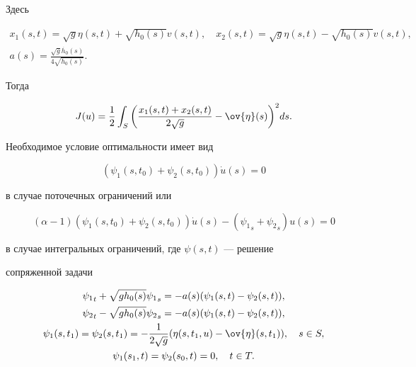 Здесь


\begin{gather*}


x_1(s,t)=\sqrt{g}\eta(s,t)+\sqrt{h_0(s)}v(s,t),\quad


x_2(s,t)=\sqrt{g}\eta(s,t)-\sqrt{h_0(s)}v(s,t),\\


a(s)=\frac{\sqrt{g}\Dot{h_0}(s)}{4\sqrt{h_0(s)}}.


\end{gather*}


Тогда 


\begin{equation}


J(u)=\frac{1}{2}\int_S \bigg(\frac{x_1(s,t)+x_2(s,t)}{2\sqrt{g}}


-\ov{\eta}(s)\bigg)^2 ds.


\label{metf1}


\end{equation}





Необходимое условие оптимальности имеет вид


$$


(\psi_1(s,t_0)+\psi_2(s,t_0))\Dot{u}(s)=0


$$


в случае поточечных ограничений или


$$


(\alpha-1)(\psi_1(s,t_0)+\psi_2(s,t_0))


\Dot{u}(s)-({\psi_1}_s+{\psi_2}_s)u(s)=0


$$


в случае интегральных ограничений, где $\psi(s,t)$ --- решение 


сопряженной задачи


\begin{gather*}


{\psi_1}_t+\sqrt{g h_0(s)}{\psi_1}_s=-a(s)(\psi_1(s,t)-\psi_2(s,t)), \\


{\psi_2}_t-\sqrt{g h_0(s)}{\psi_2}_s=-a(s)(\psi_1(s,t)-\psi_2(s,t)), \\


\psi_1(s,t_1)=\psi_2(s,t_1)=-\frac{1}{2\sqrt{g}}


(\eta(s,t_1,u)-\ov{\eta}(s,t_1)),\quad s\in S,\\


\psi_1(s_1,t)=\psi_2(s_0,t)=0,\quad t\in T.


\end{gather*}





